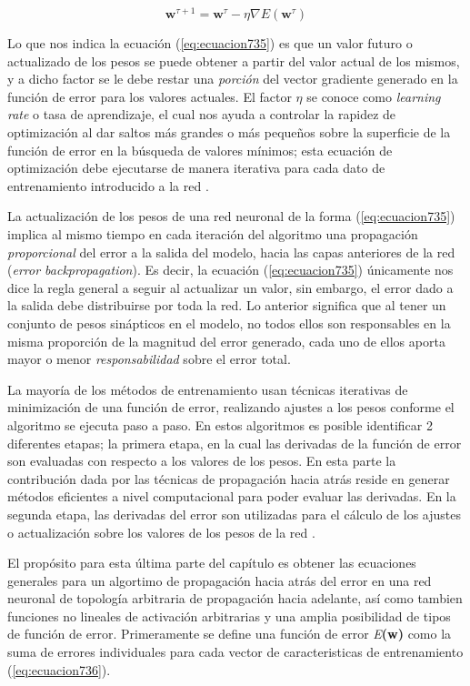 {\begin{equation}
	\textbf{w}^{\tau + 1}=\textbf{w}^{\tau} - \eta \nabla E(\textbf{w}^{\tau})
	\label{eq:ecuacion735}
\end{equation}

Lo que nos indica la ecuación (\ref{eq:ecuacion735}) es que un valor futuro o actualizado de los pesos se puede obtener a partir del valor actual de los mismos, y a dicho factor se le debe restar una \textit{porción} del 
vector gradiente generado en la función de error para los valores actuales. El factor $\eta$ se conoce como \textit{learning rate} o {tasa de aprendizaje}, el cual nos ayuda a controlar la rapidez de optimización 
al dar saltos más grandes o más pequeños sobre la superficie de la función de error en la búsqueda de valores mínimos; esta ecuación de optimización debe ejecutarse de manera iterativa para cada dato de entrenamiento introducido 
a la red \cite{bishop}. 

La actualización de los pesos de una red neuronal de la forma (\ref{eq:ecuacion735}) implica al mismo tiempo en cada iteración del algoritmo una propagación \textit{proporcional} del error a la salida del modelo, hacia las 
capas anteriores de la red (\textit{error backpropagation}). Es decir, la ecuación (\ref{eq:ecuacion735}) únicamente nos dice la regla general a seguir al actualizar un valor, sin embargo, el error dado a la salida debe distribuirse por toda la red. Lo 
anterior significa que al tener un conjunto de pesos sinápticos en el modelo, no todos ellos son responsables en la misma proporción de la magnitud del error generado, cada uno de ellos aporta mayor o menor \textit{responsabilidad} 
sobre el error total.

La mayoría de los métodos de entrenamiento usan técnicas iterativas de minimización de una función de error, realizando ajustes a los pesos conforme el algoritmo se ejecuta paso a paso. En estos algoritmos es posible identificar 
2 diferentes etapas; la primera etapa, en la cual las derivadas de la función de error son evaluadas con respecto a los valores de los pesos. En esta parte la contribución dada por las técnicas de propagación hacia atrás 
reside en generar métodos eficientes a nivel computacional para poder evaluar las derivadas. En la segunda etapa, las derivadas del error son utilizadas para el cálculo de los ajustes o actualización sobre los valores de 
los pesos de la red \cite{bishop}.

El propósito para esta última parte del capítulo es obtener las ecuaciones generales para un algortimo de propagación hacia atrás del error en una red neuronal de topología arbitraria de propagación hacia adelante, así como 
tambien funciones no lineales de activación arbitrarias y una amplia posibilidad de tipos de función de error. Primeramente se define una función de error \textit{E}\textbf{(w)} como la suma de errores individuales para cada 
vector de caracteristicas de entrenamiento (\ref{eq:ecuacion736}).

}
